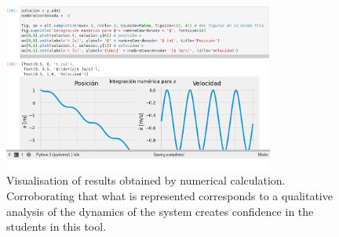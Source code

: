 \begin{figure}[!ht]
	\centering
	\includegraphics[width=3.5in]{figuras/clase5Representación.png}
	\caption{
		Visualisation of results obtained by numerical calculation.
		Corroborating that what is represented corresponds to a qualitative analysis of the dynamics of the system creates confidence in the students in this tool.
	}
	\label{fig:clase5rep}
\end{figure}









